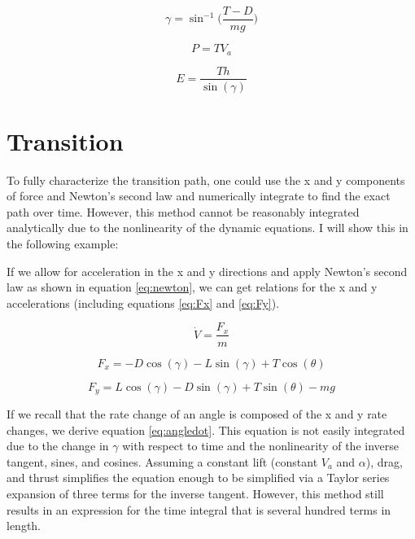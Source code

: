 \documentclass[10pt,english]{article}
\begin{document}
\begin{equation}
\label{eq:FPA}
\gamma = \sin^{-1}\Bigg(\frac{T-D}{mg}\Bigg)
\end{equation}

\begin{equation}
\label{eq:power}
P = T V_a
\end{equation}

\begin{equation}
\label{eq:energy}
E = \frac{T h }{\sin(\gamma)}
\end{equation}



\section{Transition}

To fully characterize the transition path, one could use the x and y components of force and Newton's second law and numerically integrate to find the exact path over time.  However, this method cannot be reasonably integrated analytically due to the nonlinearity of the dynamic equations.  I will show this in the following example:

If we allow for acceleration in the x and y directions and apply Newton's second law as shown in equation \ref{eq:newton}, we can get relations for the x and y accelerations (including equations \ref{eq:Fx} and \ref{eq:Fy}).

\begin{equation}
\label{eq:newton}
\dot{V} = \frac{F_x}{m}
\end{equation}

\begin{equation}
\label{eq:Fx}
F_x = -D \cos(\gamma) - L \sin(\gamma) + T \cos(\theta)
\end{equation}

\begin{equation}
\label{eq:Fy}
F_y = L \cos(\gamma) - D \sin(\gamma) + T \sin(\theta) - m g
\end{equation}

\vspace{10pt}
If we recall that the rate change of an angle is composed of the x and y rate changes, we derive equation \ref{eq:angledot}.  This equation is not easily integrated due to the change in $\gamma$ with respect to time and the nonlinearity of the inverse tangent, sines, and cosines.  Assuming a constant lift (constant $V_a$ and $\alpha$), drag, and thrust simplifies the equation enough to be simplified via a Taylor series expansion of three terms for the inverse tangent.  However, this method still results in an expression for the time integral that is several hundred terms in length.
\end{document}
